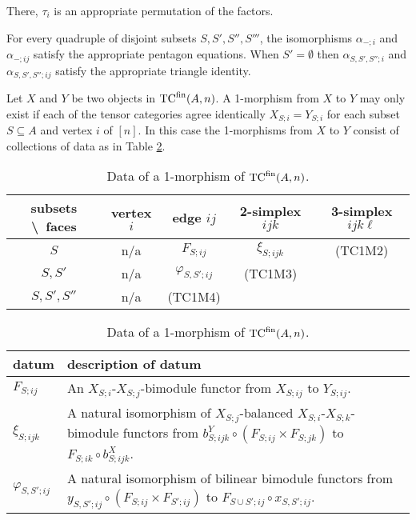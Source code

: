\documentclass{amsart}
\begin{document}
\begin{list}{(TCO)}{}
\begin{figure}[ht]
\begin{center}
\begin{tikzpicture}[align=left]
		\end{tikzpicture}
	\end{center}
		\label{fig:EqnSSSijObject}
	\end{figure}
	There, $\tau_i$ is an appropriate permutation of the factors. 
	\item  For every quadruple of disjoint subsets $S, S', S'', S'''$, the isomorphisms $\alpha_{-; i}$ and $\alpha_{-; ij}$ satisfy the appropriate pentagon equations. When $S' = \emptyset$ then $\alpha_{S, S', S''; i}$ and $\alpha_{S, S', S''; ij}$ satisfy the appropriate triangle identity.  
\end{list}

Let $X$ and $Y$ be two objects in $\TCfin(A,n)$. A 1-morphism from $X$ to $Y$ may only exist if each of the tensor categories agree identically $X_{S;i} = Y_{S;i}$ for each subset $S \subseteq A$ and vertex $i$ of $[n]$. 
In this case the 1-morphisms from $X$ to $Y$ consist of collections of data as in Table \ref{Table:1MorOfTC}.
\begin{table}[h]
	\caption{Data of a 1-morphism of $\TCfin(A,n)$.}
	\begin{tabular}{c |cccc}
	 subsets \textbackslash\ faces & vertex $i$ & edge $ij$ & 2-simplex $ijk$ & 3-simplex $ijk\ell$  \\
	\hline
	$S$ 				& n/a & $F_{S; ij}$ & $\xi_{S; ijk}$  &  (TC1M2) \\
	$S, S'$ 			& n/a & $\varphi_{S, S';ij}$ &  (TC1M3) & \\
	$S, S', S''$ 		& n/a  & (TC1M4) & & \\
	\end{tabular}
	
	\vspace{0.5cm}
	
	\begin{tabular}{l p{11cm}}
		datum & description of datum \\ \hline
		$F_{S;ij}$ & An $X_{S;i}$-$X_{S;j}$-bimodule functor from $X_{S;ij}$ to $Y_{S;ij}$. \\
		$\xi_{S;ijk}$ & A natural isomorphism of $X_{S;j}$-balanced $X_{S;i}$-$X_{S;k}$-bimodule functors from $b^Y_{S;ijk} \circ (F_{S;ij} \times F_{S; jk})$ to $F_{S;ik} \circ b^X_{S;ijk}$. \\
		$\varphi_{S,S'; ij}$ & A natural isomorphism of bilinear bimodule functors from $y_{S,S'; ij} \circ (F_{S; ij} \times F_{S';ij})$ to $F_{S \cup S'; ij} \circ x_{S, S'; ij}$. 
	\end{tabular}
	\label{Table:1MorOfTC}
\end{table}
\end{document}
